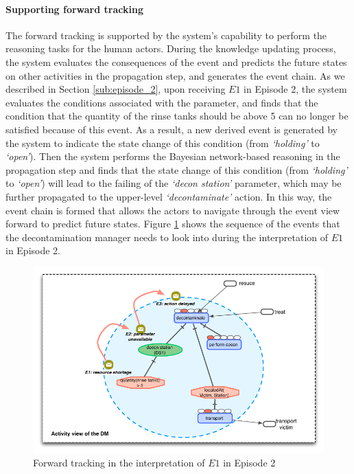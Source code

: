 \paragraph*{Supporting forward tracking} %
\label{par:supporting_forward_tracking}
The forward tracking is supported by the system's capability to perform the reasoning tasks for the human actors. During the knowledge updating process, the system evaluates the consequences of the event and predicts the future states on other activities in the propagation step, and generates the event chain. As we described in Section \ref{sub:episode_2}, upon receiving $E1$ in Episode 2, the system evaluates the conditions associated with the parameter, and finds that the condition that the quantity of the rinse tanks should be above 5 can no longer be satisfied because of this event. As a result, a new derived event is generated by the system to indicate the state change of this condition (from \emph{`holding'} to \emph{`open'}). Then the system performs the Bayesian network-based reasoning in the propagation step and finds that the state change of this condition (from \emph{`holding'} to \emph{`open'}) will lead to the failing of the \emph{`decon station'} parameter, which may be further propagated to the upper-level \emph{`decontaminate'} action. In this way, the event chain is formed that allows the actors to navigate through the event view forward to predict future states. Figure \ref{fig:forward_chain} shows the sequence of the events that the decontamination manager needs to look into during the interpretation of $E1$ in Episode 2.

\begin{figure}[htbp] %
	\centering
	\includegraphics{forward_chain.pdf} 
	\caption{Forward tracking in the interpretation of $E1$ in Episode 2}
	\label{fig:forward_chain}
\end{figure}

